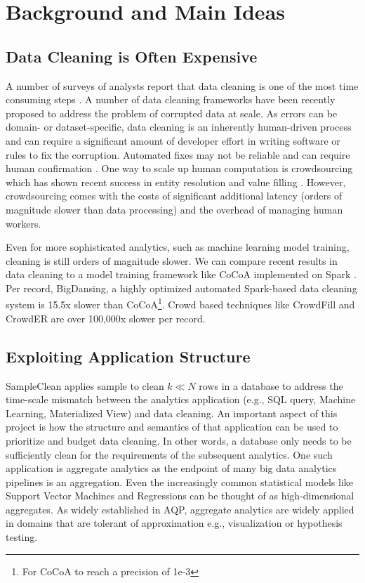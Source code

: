 \section{Background and Main Ideas}

\subsection{Data Cleaning is Often Expensive}
A number of surveys of analysts report that data cleaning is one of the most time consuming steps \cite{kandel2012enterprise, nytimes}.
A number of data cleaning frameworks have been recently proposed to address the problem of corrupted data at scale\cite{khayyat2015bigdansing, chu2015katara, sampleclean}.
As errors can be domain- or dataset-specific, data cleaning is an inherently human-driven process and can require a significant amount of developer effort in writing software or rules to fix the corruption.
Automated fixes may not be reliable and can require human confirmation \cite{DBLP:journals/pvldb/YakoutENOI11}.
One way to scale up human computation is crowdsourcing which has shown recent success in entity resolution and value filling \cite{gokhale2014corleone, park2014crowdfill, sampleclean,chu2015katara}.
However, crowdsourcing comes with the costs of significant additional latency (orders of magnitude slower than data processing) and the overhead of managing human workers.

Even for more sophisticated analytics, such as machine learning model training, cleaning is still orders of magnitude slower.
We can compare recent results in data cleaning to a model training framework like CoCoA implemented on Spark \cite{jaggi2014communication}.
Per record, BigDansing, a highly optimized automated Spark-based data cleaning system is 15.5x slower than CoCoA\footnote{For CoCoA to reach a precision of 1e-3}.
Crowd based techniques like CrowdFill \cite{park2014crowdfill} and CrowdER \cite{wang2012crowder} are over 100,000x slower per record. 

\subsection{Exploiting Application Structure}
SampleClean applies sample to clean $k\ll N$ rows in a database to address the time-scale mismatch between the analytics application (e.g., SQL query, Machine Learning, Materialized View) and data cleaning.
An important aspect of this project is how the structure and semantics of that application can be used to prioritize and budget data cleaning.
In other words, a database only needs to be sufficiently clean for the requirements of the subsequent analytics.
One such application is aggregate analytics as the endpoint of many big data analytics pipelines is an aggregation.
Even the increasingly common statistical models like Support Vector Machines and Regressions can be thought of as high-dimensional aggregates.
As widely established in AQP, aggregate analytics are widely applied in domains that are tolerant of approximation e.g., visualization or hypothesis testing.

